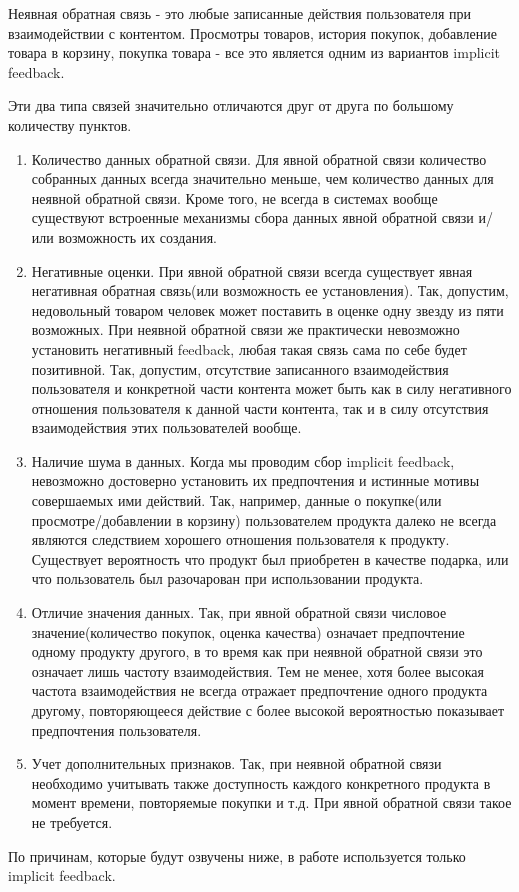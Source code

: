 \documentclass[14pt]{mmcs_article}
\newenvironment{myenumerate}
{ \begin{enumerate}
		\setlength{\itemsep}{0pt}
		\setlength{\parskip}{0pt}
		\setlength{\parsep}{0pt}     }
	{ \end{enumerate}                  }
\begin{document}
Неявная обратная связь - это любые записанные действия пользователя при взаимодействии с контентом. Просмотры товаров, история покупок, добавление товара в корзину, покупка товара - все это является одним из вариантов implicit feedback. 

Эти два типа связей значительно отличаются друг от друга по большому количеству пунктов.
\begin{myenumerate}
\item Количество данных обратной связи. Для явной обратной связи количество собранных данных всегда значительно меньше, чем количество данных для неявной обратной связи. Кроме того, не всегда в системах вообще существуют встроенные механизмы  сбора данных явной обратной связи и/или возможность их создания. 
\item Негативные оценки. При явной обратной связи всегда существует явная негативная обратная связь(или возможность ее установления). Так, допустим, недовольный товаром человек может поставить в оценке одну звезду из пяти возможных. При неявной обратной связи же практически невозможно установить негативный feedback, любая такая связь сама по себе будет позитивной. Так, допустим, отсутствие записанного взаимодействия пользователя и конкретной части контента может быть как в силу негативного отношения пользователя к данной части контента, так и в силу отсутствия взаимодействия этих пользователей вообще.  
\item Наличие шума в данных. Когда мы проводим сбор implicit feedback, невозможно достоверно установить их предпочтения и истинные мотивы совершаемых ими действий. Так, например, данные о покупке(или просмотре/добавлении в корзину) пользователем продукта далеко не всегда являются следствием хорошего отношения пользователя к продукту. Существует вероятность что продукт был приобретен в качестве подарка, или что пользователь был разочарован при использовании продукта.
\item Отличие значения данных. Так, при явной обратной связи числовое значение(количество покупок, оценка качества) означает предпочтение одному продукту другого, в то время как при неявной обратной связи это означает лишь частоту взаимодействия. Тем не менее, хотя более высокая частота взаимодействия не всегда отражает предпочтение одного продукта другому, повторяющееся действие с более высокой вероятностью показывает предпочтения пользователя.
\item Учет дополнительных признаков. Так, при неявной обратной связи необходимо учитывать также доступность каждого конкретного продукта в момент времени, повторяемые покупки и т.д. При явной обратной связи такое не требуется.
\end{myenumerate}
По причинам, которые будут озвучены ниже, в работе используется только implicit feedback.
\end{document}
